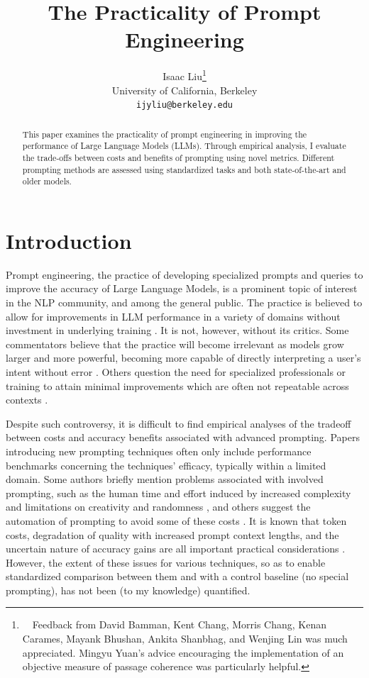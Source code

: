 \documentclass[11pt]{article}
\title{The Practicality of Prompt Engineering}
\author{Isaac Liu\thanks{~~Feedback from David Bamman, Kent Chang, Morris Chang, Kenan Carames, Mayank Bhushan, Ankita Shanbhag, and Wenjing Lin was much appreciated. Mingyu Yuan's advice encouraging the implementation of an objective measure of passage coherence was particularly helpful.}
\\
  University of California, Berkeley \\
  \texttt{ijyliu@berkeley.edu}}
\begin{document}
\maketitle

\begin{abstract}
  This paper examines the practicality of prompt engineering in improving the performance of Large Language Models (LLMs). Through empirical analysis, I evaluate the trade-offs between costs and benefits of prompting using novel metrics. Different prompting methods are assessed using standardized tasks and both state-of-the-art and older models.
\end{abstract}

\section*{Introduction}

Prompt engineering, the practice of developing specialized prompts and queries to improve the accuracy of Large Language Models, is a prominent topic of interest in the NLP community, and among the general public. The practice is believed to allow for improvements in LLM performance in a variety of domains without investment in underlying training \cite{martineau_what_2021}. It is not, however, without its critics. Some commentators believe that the practice will become irrelevant as models grow larger and more powerful, becoming more capable of directly interpreting a user's intent without error \cite{ethan_mollick_emollick_i_2023}. Others question the need for specialized professionals or training to attain minimal improvements which are often not repeatable across contexts \cite{shackell_prompt_2023, acar_ai_2023}. 

Despite such controversy, it is difficult to find empirical analyses of the tradeoff between costs and accuracy benefits associated with advanced prompting. Papers introducing new prompting techniques often only include performance benchmarks concerning the techniques' efficacy, typically within a limited domain. Some authors briefly mention problems associated with involved prompting, such as the human time and effort induced by increased complexity and limitations on creativity and randomness \cite{wu_ai_2022}, and others suggest the automation of prompting to avoid some of these costs \cite{diao_active_2023}. It is known that token costs, degradation of quality with increased prompt context lengths, and the uncertain nature of accuracy gains are all important practical considerations \cite{gao_prompt_2023}. However, the extent of these issues for various techniques, so as to enable standardized comparison between them and with a control baseline (no special prompting), has not been (to my knowledge) quantified.
\end{document}
